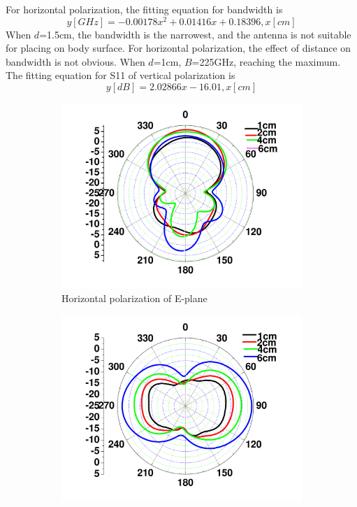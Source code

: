 \documentclass[journal]{IEEEtran}
\begin{document}
For horizontal polarization, the fitting equation for bandwidth is
\begin{equation}
\label{eq:eps_3}
y[GHz]=-0.00178x^2+0.01416x+0.18396,  x[cm]
\end{equation}
When $d$=1.5cm, the bandwidth is the narrowest, and the antenna is not suitable for placing on body surface. For
horizontal polarization, the effect of distance on bandwidth is not obvious. When $d$=1cm, $B$=225GHz, reaching
the maximum. The fitting equation for S11 of vertical polarization is
\begin{equation}
\label{eq:eps_4}
y[dB]=2.02866x-16.01,  x[cm]
\end{equation}
\begin{figure}[!htb]
\centering
\begin{subfigure}[b]{0.24\textwidth}
\includegraphics[width=\textwidth]{figs/9a.pdf}
\caption{Horizontal polarization of E-plane}
\label{fig:9a}	
\end{subfigure}		
\begin{subfigure}[b]{0.24\textwidth}
\includegraphics[width=\textwidth]{figs/9b.pdf}

\end{subfigure}
\end{figure}
\end{document}
